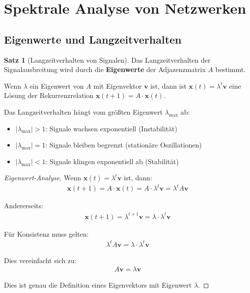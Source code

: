 ﻿\documentclass[a4paper,12pt]{report}
\theoremstyle{definition}
\newtheorem{satz}{Satz}
\begin{document}
	\section{Spektrale Analyse von Netzwerken}
	
	\subsection{Eigenwerte und Langzeitverhalten}
	
	\begin{satz}[Langzeitverhalten von Signalen]
		Das Langzeitverhalten der Signalausbreitung wird durch die \textbf{Eigenwerte} der Adjazenzmatrix $A$ bestimmt.
		
		Wenn $\lambda$ ein Eigenwert von $A$ mit Eigenvektor $\mathbf{v}$ ist, dann ist $\mathbf{x}(t) = \lambda^t \mathbf{v}$ eine Lösung der Rekurrenzrelation $\mathbf{x}(t+1) = A \cdot \mathbf{x}(t)$.
		
		Das Langzeitverhalten hängt vom größten Eigenwert $\lambda_{\max}$ ab:
		\begin{itemize}
			\item[-] $|\lambda_{\max}| > 1$: Signale wachsen exponentiell (Instabilität)
			\item[-] $|\lambda_{\max}| = 1$: Signale bleiben begrenzt (stationäre Oszillationen)
			\item[-] $|\lambda_{\max}| < 1$: Signale klingen exponentiell ab (Stabilität)
		\end{itemize}
	\end{satz}
	
	\begin{proof}[Eigenwert-Analyse]
		Wenn $\mathbf{x}(t) = \lambda^t \mathbf{v}$ ist, dann:
		\begin{align}
			\mathbf{x}(t+1) = A \cdot \mathbf{x}(t) = A \cdot \lambda^t \mathbf{v} = \lambda^t A \mathbf{v}
		\end{align}
		
		Andererseits:
		\begin{align}
			\mathbf{x}(t+1) = \lambda^{t+1} \mathbf{v} = \lambda \cdot \lambda^t \mathbf{v}
		\end{align}
		
		Für Konsistenz muss gelten:
		\begin{align}
			\lambda^t A \mathbf{v} = \lambda \cdot \lambda^t \mathbf{v}
		\end{align}
		
		Dies vereinfacht sich zu:
		\begin{align}
			A \mathbf{v} = \lambda \mathbf{v}
		\end{align}
		
		Dies ist genau die Definition eines Eigenvektors mit Eigenwert $\lambda$.
	\end{proof}
	
\end{document}
